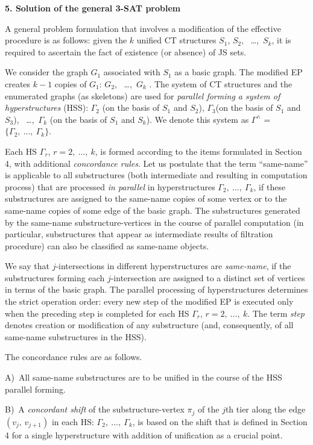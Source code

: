 \documentclass[12pt, a4paper]{article}
\begin{document}
\medskip
{\bf 5. Solution of the general 3-SAT problem}

A general problem formulation that involves a modification of the effective procedure is as follows: given the $k$  unified CT structures $S_1$, $S_2$, \ \dots,\  $S_k$, it is required to ascertain the fact of existence (or absence) of JS sets.

We consider the graph $G_1$ associated with $S_1$ as a basic graph. The modified EP creates $k-1$ copies of $G_1$: $G_2$, \ \dots,\ $G_k$ . The system of CT structures and the enumerated graphs (as skeletons) are used for {\it parallel forming a system of hyperstructures} (HSS):  $\Gamma_2$ (on the basis of $S_1$ and $S_2$), $\Gamma_3$(on the basis of $S_1$ and $S_3$), \ \dots,\  $\Gamma_k$ (on the basis of $S_1$ and $S_k$). We denote this system as $\Gamma^\wedge$ = $\{\Gamma_2, \ \dots ,\ \Gamma_k\}$.

Each HS $\Gamma_r$, $r=2, \ \dots,\ k$, is formed according to the items formulated  in Section 4, with additional {\it concordance rules}. Let us postulate that the term ``same-name'' is applicable to all substructures (both intermediate and resulting in computation process) that are processed {\it in parallel} in
hyperstructures $\Gamma_2, \ \dots,\ \Gamma_k$, if these substructures are assigned to the same-name copies of some vertex or to the same-name copies of some edge of the basic graph. The substructures generated by the same-name substructure-vertices in the course of parallel computation (in particular, substructures that appear as intermediate results of filtration procedure) can also be classified as same-name objects.

We say that $j$-intersections in different hyperstructures are {\it same-name}, if the substructures forming each $j$-intersection are assigned to a distinct set of vertices in terms of the basic graph. The parallel processing of hyperstructures determines the strict operation order: every new step of the modified EP is executed only when the preceding step is completed for each HS $\Gamma_r$, $r=2, \ \dots,\ k$. The term {\it step} denotes creation or modification of any substructure (and, consequently, of all same-name substructures in the HSS).

The concordance rules are as follows.

\hangindent=1.1cm
A)\  All same-name substructures are to be unified in the course of the HSS parallel forming.

\hangindent=1.1cm
B)\  A {\it concordant shift} of the substructure-vertex $\pi_j$ of the  $j$th tier along the edge $(v_j,\,v_{j+1})$ in each HS: $\Gamma_2, \ \dots,\ \Gamma_k$, is based on the shift that is defined in Section 4 for a single hyperstructure with addition of unification as a crucial point.
\end{document}
